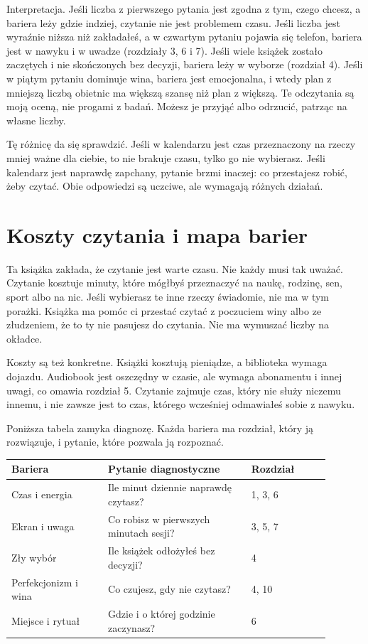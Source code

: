 Interpretacja. Jeśli liczba z pierwszego pytania jest zgodna z tym, czego chcesz, a bariera leży gdzie indziej, czytanie nie jest problemem czasu. Jeśli liczba jest wyraźnie niższa niż zakładałeś, a w czwartym pytaniu pojawia się telefon, bariera jest w nawyku i w uwadze (rozdziały 3, 6 i 7). Jeśli wiele książek zostało zaczętych i nie skończonych bez decyzji, bariera leży w wyborze (rozdział 4). Jeśli w piątym pytaniu dominuje wina, bariera jest emocjonalna, i wtedy plan z mniejszą liczbą obietnic ma większą szansę niż plan z większą. Te odczytania są moją oceną, nie progami z badań. Możesz je przyjąć albo odrzucić, patrząc na własne liczby.

\begin{uwaga}
Tę różnicę da się sprawdzić. Jeśli w kalendarzu jest czas przeznaczony na rzeczy mniej ważne dla ciebie, to nie brakuje czasu, tylko go nie wybierasz. Jeśli kalendarz jest naprawdę zapchany, pytanie brzmi inaczej: co przestajesz robić, żeby czytać. Obie odpowiedzi są uczciwe, ale wymagają różnych działań.
\end{uwaga}

\section{Koszty czytania i mapa barier}

Ta książka zakłada, że czytanie jest warte czasu. Nie każdy musi tak uważać. Czytanie kosztuje minuty, które mógłbyś przeznaczyć na naukę, rodzinę, sen, sport albo na nic. Jeśli wybierasz te inne rzeczy świadomie, nie ma w tym porażki. Książka ma pomóc ci przestać czytać z poczuciem winy albo ze złudzeniem, że to ty nie pasujesz do czytania. Nie ma wymuszać liczby na okładce.

Koszty są też konkretne. Książki kosztują pieniądze, a biblioteka wymaga dojazdu. Audiobook jest oszczędny w czasie, ale wymaga abonamentu i innej uwagi, co omawia rozdział 5. Czytanie zajmuje czas, który nie służy niczemu innemu, i nie zawsze jest to czas, którego wcześniej odmawiałeś sobie z nawyku.

Poniższa tabela zamyka diagnozę. Każda bariera ma rozdział, który ją rozwiązuje, i pytanie, które pozwala ją rozpoznać.

\begin{center}
\begin{tabular}{@{}p{0.27\linewidth}p{0.40\linewidth}p{0.22\linewidth}@{}}
\toprule
Bariera & Pytanie diagnostyczne & Rozdział \\
\midrule
Czas i energia & Ile minut dziennie naprawdę czytasz? & 1, 3, 6 \\
Ekran i uwaga & Co robisz w pierwszych minutach sesji? & 3, 5, 7 \\
Zły wybór & Ile książek odłożyłeś bez decyzji? & 4 \\
Perfekcjonizm i wina & Co czujesz, gdy nie czytasz? & 4, 10 \\
Miejsce i rytuał & Gdzie i o której godzinie zaczynasz? & 6 \\
\bottomrule
\end{tabular}
\end{center}

